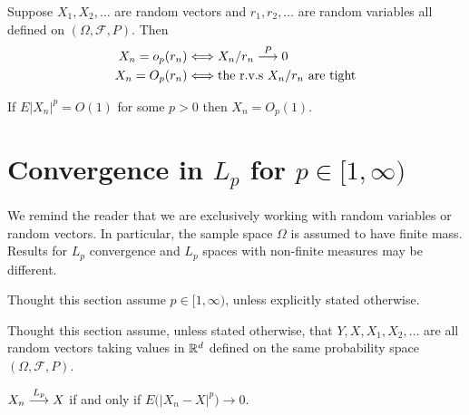 \begin{definition}
Suppose $X_1, X_2, \ldots$ are random vectors and $r_1, r_2, \ldots$ are random variables all defined on $(\Omega,\mathcal F, P)$. Then
\begin{align*}
X_n = o_p(r_n)&\Longleftrightarrow X_n/r_n \overset{\small P} \longrightarrow  0 \\
X_n = O_p(r_n)&\Longleftrightarrow \text{the {\rm r.v.s} $X_n/r_n$ are tight}
\end{align*}
\end{definition}

\begin{claim}
If $E|X_n|^p=O(1)$ for some $p>0$ then $X_n = O_p(1)$.
\end{claim}


\clearpage
%
%
\section{Convergence in $L_p$ for $p\in [1,\infty)$}

\begin{warning} We remind the reader that we are exclusively working with random variables or random vectors. In particular, the sample space $\Omega$ is assumed to have finite mass. Results for $L_p$ convergence and $L_p$ spaces with non-finite measures may be different.
\end{warning}


\begin{sectionassumption}
Thought this section assume $p\in[1,\infty)$, unless explicitly stated otherwise.
\end{sectionassumption}



\begin{sectionassumption}
Thought this section assume, unless stated otherwise, that $Y, X, X_1, X_2,\ldots$ are all random vectors taking values in $\Bbb R^d$ defined on the same probability space $(\Omega, \mathcal F, P)$.
\end{sectionassumption}





\begin{definition}
$ X_n\overset{\small L_p} \longrightarrow X $ if and only if  $E\bigl(|X_n - X|^p \bigr) \rightarrow 0$.
\end{definition}


